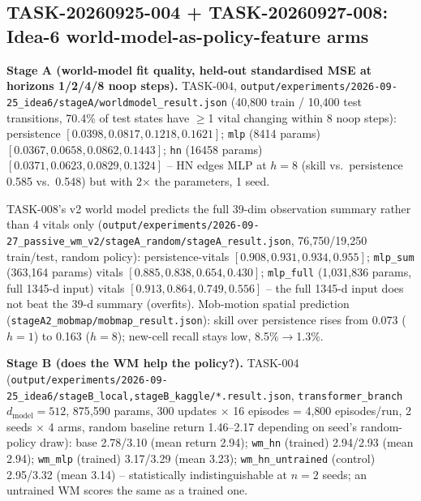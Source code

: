 \documentclass[11pt]{article}
\newcommand{\srcpath}[1]{\texttt{\small #1}}
\begin{document}
\subsection{TASK-20260925-004 + TASK-20260927-008: Idea-6 world-model-as-policy-feature arms}

\textbf{Stage A (world-model fit quality, held-out standardised MSE at horizons 1/2/4/8 noop
steps).} TASK-004, \srcpath{output/experiments/2026-09-25\_idea6/stageA/worldmodel\_result.json}
(40{,}800 train / 10{,}400 test transitions, 70.4\% of test states have $\ge$1 vital changing within
8 noop steps): persistence $[0.0398, 0.0817, 0.1218, 0.1621]$; \texttt{mlp} (8414 params) $[0.0367,
0.0658, 0.0862, 0.1443]$; \texttt{hn} (16458 params) $[0.0371, 0.0623, 0.0829, 0.1324]$ -- HN edges
MLP at $h{=}8$ (skill vs.\ persistence 0.585 vs.\ 0.548) but with 2$\times$ the parameters, 1 seed.

TASK-008's v2 world model predicts the full 39-dim observation summary rather than 4 vitals only
(\srcpath{output/experiments/2026-09-27\_passive\_wm\_v2/stageA\_random/stageA\_result.json},
76{,}750/19{,}250 train/test, random policy): persistence-vitals $[0.908, 0.931, 0.934, 0.955]$;
\texttt{mlp\_sum} (363{,}164 params) vitals $[0.885, 0.838, 0.654, 0.430]$; \texttt{mlp\_full}
(1{,}031{,}836 params, full 1345-d input) vitals $[0.913, 0.864, 0.749, 0.556]$ -- the full
1345-d input does not beat the 39-d summary (overfits). Mob-motion spatial prediction
(\srcpath{stageA2\_mobmap/mobmap\_result.json}): skill over persistence rises from 0.073 ($h{=}1$)
to 0.163 ($h{=}8$); new-cell recall stays low, 8.5\%$\to$1.3\%.

\textbf{Stage B (does the WM help the policy?).} TASK-004
(\srcpath{output/experiments/2026-09-25\_idea6/stageB\_local,stageB\_kaggle/*.result.json},
\texttt{transformer\_branch} $d_{\text{model}}=512$, 875{,}590 params, 300 updates $\times$ 16
episodes = 4{,}800 episodes/run, 2 seeds $\times$ 4 arms, random baseline return 1.46--2.17
depending on seed's random-policy draw): base 2.78/3.10 (mean return 2.94); \texttt{wm\_hn} (trained)
2.94/2.93 (mean 2.94); \texttt{wm\_mlp} (trained) 3.17/3.29 (mean 3.23); \texttt{wm\_hn\_untrained}
(control) 2.95/3.32 (mean 3.14) -- statistically indistinguishable at $n{=}2$ seeds; an untrained WM
scores the same as a trained one.
\end{document}
